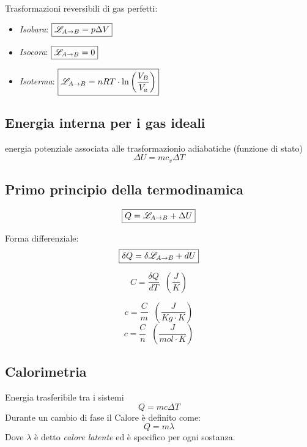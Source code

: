 Trasformazioni reversibili di gas perfetti:
\begin{itemize}
    \item \emph{Isobara}: $\boxed{\mathscr{L}_{A \to B} = p \Delta V}$
    \item \emph{Isocora}: $\boxed{\mathscr{L}_{A \to B} = 0}$
    \item \emph{Isoterma}: $\boxed{\mathscr{L}_{A \to B} = nRT \cdot \ln{\left (\frac{V_B}{V_a} \right)}}$
\end{itemize}

\subsection{Energia interna per i gas ideali}
 energia potenziale associata alle trasformazionio adiabatiche (funzione di stato)
\begin{equation}
    \boxed{\Delta U = m c_v \Delta T}
\end{equation}

\subsection{Primo principio della termodinamica}
\begin{equation}
    \boxed{Q= \mathscr{L}_{A \to B} + \Delta U}
\end{equation}

Forma differenziale:
\begin{equation}
    \boxed{\delta Q= \delta \mathscr{L}_{A \to B} + dU}
\end{equation}

\vspace{\baselineskip}
\[
C = \frac{\delta Q}{dT} \;\; \left( \frac{J}{K} \right)
\]

\vspace{\baselineskip}
\[
c = \frac{C}{m} \;\; \left( \frac{J}{Kg \cdot K} \right) 
\]
\[
c = \frac{C}{n} \;\; \left( \frac{J}{mol \cdot K} \right)
\]

\subsection{Calorimetria}
 Energia trasferibile tra i sistemi
\begin{equation}
    \boxed{Q = m c \Delta T}
\end{equation}
Durante un cambio di fase il Calore è definito come:
\begin{equation}
    \boxed{Q = m \lambda}
\end{equation}
Dove $\lambda$ è detto \emph{calore latente} ed è specifico per ogni sostanza.

